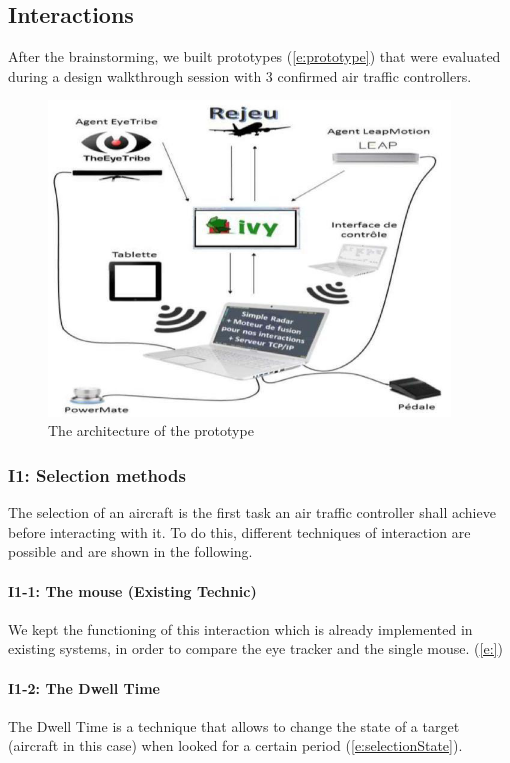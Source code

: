 \subsection{Interactions}
After the brainstorming, we built prototypes (\autoref{e:prototype}) that were
evaluated during a design walkthrough session with 3
confirmed air traffic controllers.

 \begin{figure}
 \centering
	\includegraphics[width=0.95\textwidth]{Figures/prototype.png}
	\caption{ The architecture of the prototype}
	\label{e:prototype}
\end{figure}

\subsubsection{I1: Selection methods}
The selection of an aircraft is the first task an air traffic
controller shall achieve before interacting with it. To do this, different techniques of
interaction are possible and are shown in the following.

\paragraph{I1-1: The mouse (Existing Technic)}

We kept the functioning of this interaction which is already
implemented in existing systems, in order to compare the
eye tracker and the single mouse. (\autoref{e:})


\paragraph{I1-2: The Dwell Time}
The Dwell Time is a technique that allows to change the
state of a target (aircraft in this case) when looked for a
certain period (\autoref{e:selectionState}).

